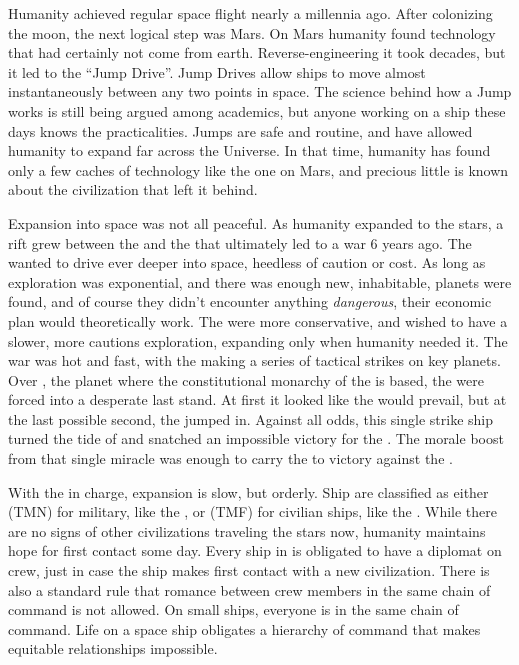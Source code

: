\documentclass[blue]{TMFHope}
\begin{document}
\name{\bHistory{}}

Humanity achieved regular space flight nearly a millennia ago. After colonizing the moon, the next logical step was Mars. On Mars humanity found technology that had certainly not come from earth. Reverse-engineering it took decades, but it led to the ``Jump Drive''. Jump Drives allow ships to move almost instantaneously between any two points in space. The science behind how a Jump works is still being argued among academics, but anyone working on a ship these days knows the practicalities. Jumps are safe and routine, and have allowed humanity to expand far across the Universe. In that time, humanity has found only a few caches of technology like the one on Mars, and precious little is known about the civilization that left it behind.

Expansion into space was not all peaceful. As humanity expanded to the stars, a rift grew between the \pPlan{} and the \pEdge{} that ultimately led to a war 6 years ago. The \pEdge{} wanted to drive ever deeper into space, heedless of caution or cost. As long as exploration was exponential, and there was enough new, inhabitable, planets were found, and of course they didn't encounter anything \emph{dangerous}, their economic plan would theoretically work. The \pPlan{} were more conservative, and wished to have a slower, more cautions exploration, expanding only when humanity needed it. The war was hot and fast, with the \pEdge{} making a series of tactical strikes on key \pPlan{} planets. Over \pHome{}, the planet where the constitutional monarchy of the \pPlan{} is based, the \pPlan{} were forced into a desperate last stand. At first it looked like the \pEdge{} would prevail, but at the last possible second, the \pOld{} jumped in. Against all odds, this single strike ship turned the tide of \pBattle{} and snatched an impossible victory for the \pPlan{}. The morale boost from that single miracle was enough to carry the \pPlan{} to victory against the \pEdge{}.

With the \pPlan{} in charge, expansion is slow, but orderly. Ship are classified as either \pTMN{} (TMN) for military, like the \pOld{}, or \pTMF{} (TMF) for civilian ships, like the \pNew{}. While there are no signs of other civilizations traveling the stars now, humanity maintains hope for first contact some day. Every ship in \pTMF{} is obligated to have a diplomat on crew, just in case the ship makes first contact with a new civilization. There is also a standard rule that romance between crew members in the same chain of command is not allowed. On small \pTMF{} ships, everyone is in the same chain of command. Life on a space ship obligates a hierarchy of command that makes equitable relationships impossible.
\end{document}
